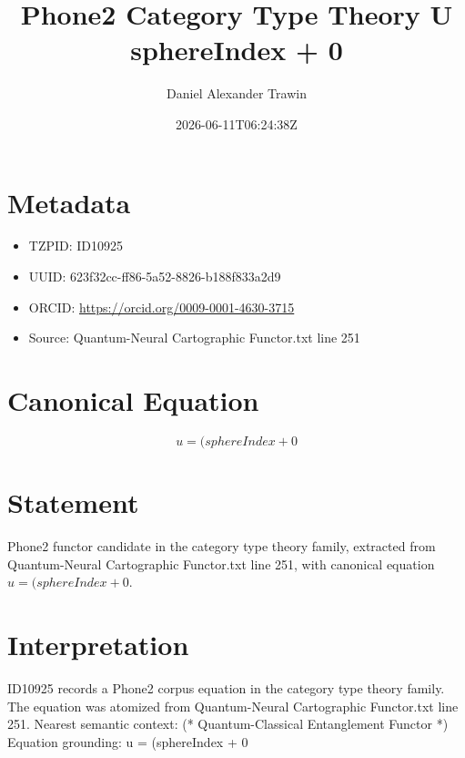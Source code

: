 \documentclass[11pt]{article}
\title{Phone2 Category Type Theory U sphereIndex + 0}
\author{Daniel Alexander Trawin}
\date{2026-06-11T06:24:38Z}
\begin{document}
\maketitle
\section*{Metadata}
\begin{itemize}
\item TZPID: ID10925
\item UUID: 623f32cc-ff86-5a52-8826-b188f833a2d9
\item ORCID: \url{https://orcid.org/0009-0001-4630-3715}
\item Source: Quantum-Neural Cartographic Functor.txt line 251
\end{itemize}
\section*{Canonical Equation}
\[
u = (sphereIndex + 0
\]
\section*{Statement}
Phone2 functor candidate in the category type theory family, extracted from Quantum-Neural Cartographic Functor.txt line 251, with canonical equation $u = (sphereIndex + 0$.
\section*{Interpretation}
ID10925 records a Phone2 corpus equation in the category type theory family. The equation was atomized from Quantum-Neural Cartographic Functor.txt line 251. Nearest semantic context: (* Quantum-Classical Entanglement Functor *) Equation grounding: u = (sphereIndex + 0
\end{document}
